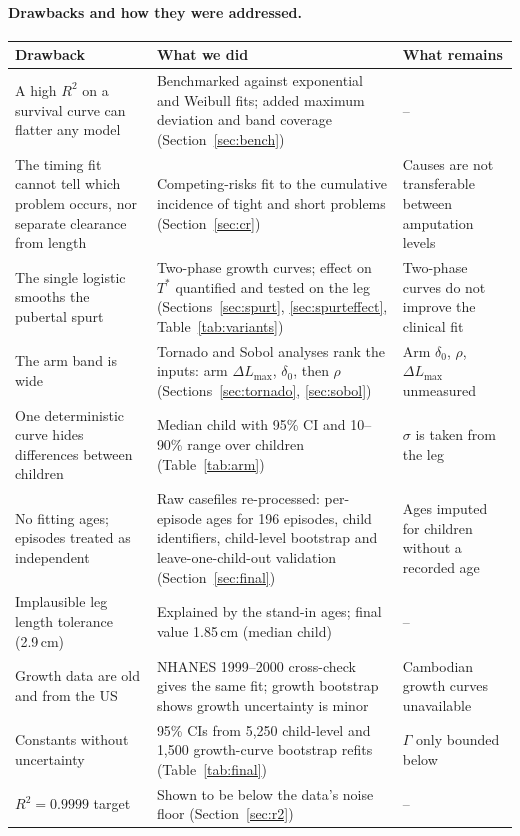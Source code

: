 \documentclass[11pt]{article}
\theoremstyle{definition}
\begin{document}
\paragraph{Drawbacks and how they were addressed.}
\begin{center}
\footnotesize
\renewcommand{\arraystretch}{1.25}
\begin{tabular}{@{}L{5.1cm}L{6.2cm}L{4.4cm}@{}}
\toprule
Drawback & What we did & What remains\\
\midrule
A high $R^2$ on a survival curve can flatter any model & Benchmarked against exponential and Weibull fits; added maximum deviation and band coverage (Section~\ref{sec:bench}) & --\\
The timing fit cannot tell which problem occurs, nor separate clearance from length & Competing-risks fit to the cumulative incidence of tight and short problems (Section~\ref{sec:cr}) & Causes are not transferable between amputation levels\\
The single logistic smooths the pubertal spurt & Two-phase growth curves; effect on $T^*$ quantified and tested on the leg (Sections~\ref{sec:spurt}, \ref{sec:spurteffect}, Table~\ref{tab:variants}) & Two-phase curves do not improve the clinical fit\\
The arm band is wide & Tornado and Sobol analyses rank the inputs: arm $\Delta L_{\max}$, $\delta_0$, then $\rho$ (Sections~\ref{sec:tornado}, \ref{sec:sobol}) & Arm $\delta_0$, $\rho$, $\Delta L_{\max}$ unmeasured\\
One deterministic curve hides differences between children & Median child with 95\% CI and 10--90\% range over children (Table~\ref{tab:arm}) & $\sigma$ is taken from the leg\\
No fitting ages; episodes treated as independent & Raw casefiles re-processed: per-episode ages for 196 episodes, child identifiers, child-level bootstrap and leave-one-child-out validation (Section~\ref{sec:final}) & Ages imputed for children without a recorded age\\
Implausible leg length tolerance (2.9\,cm) & Explained by the stand-in ages; final value 1.85\,cm (median child) & --\\
Growth data are old and from the US & NHANES 1999--2000 cross-check gives the same fit; growth bootstrap shows growth uncertainty is minor & Cambodian growth curves unavailable\\
Constants without uncertainty & 95\% CIs from 5,250 child-level and 1,500 growth-curve bootstrap refits (Table~\ref{tab:final}) & $\Gamma$ only bounded below\\
$R^2=0.9999$ target & Shown to be below the data's noise floor (Section~\ref{sec:r2}) & --\\
\bottomrule
\end{tabular}
\end{center}
\end{document}
